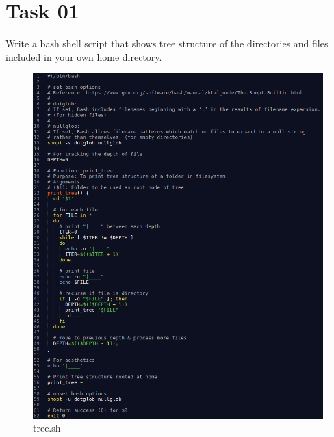 \documentclass[12pt,a4paper]{article}
\begin{document}
\section{Task 01}
Write a bash shell script that shows tree structure of the directories and files included in your own home directory.

\begin{figure}[!h]
	\centering
	\includegraphics[width=6in]{./task01/task01.png}
	\caption{tree.sh}
\end{figure}

\newpage
\end{document}
